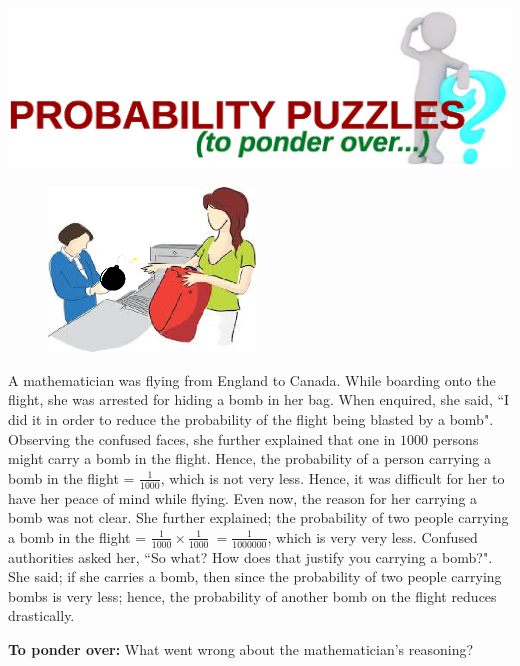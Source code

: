 \documentclass{article}
\begin{document}
\includegraphics[scale=0.7]{puzzles.eps}

\begin{tcolorbox}
\begin{figure}
\includegraphics[width=5.5cm]{bmb.eps}
\end{figure} 
A mathematician was flying from England to Canada. While boarding onto the flight, she was arrested for hiding a bomb in her bag. When enquired, she said, ``I did it in order to reduce the probability of the flight being blasted by a bomb". Observing the confused faces, she further explained that one in $1000$ persons might carry a bomb in the flight. Hence, the probability of a person carrying a bomb in the flight = $\frac{1}{1000}$, which is not very less. Hence, it was difficult for her to have her peace of mind while flying. Even now, the reason for her carrying a bomb was not clear. She further explained; the probability of two people carrying a bomb in the flight = $\frac{1}{1000} \times \frac{1}{1000}\ = \frac{1}{1000000}$, which is very very less. Confused authorities asked her, ``So what? How does that justify you carrying a bomb?". She said; if she carries a bomb, then since the probability of two people carrying bombs is very less; hence, the probability of another bomb on the flight reduces drastically. 

\textbf{To ponder over:} What went wrong about the mathematician's reasoning?

\end{tcolorbox}
\end{document}
